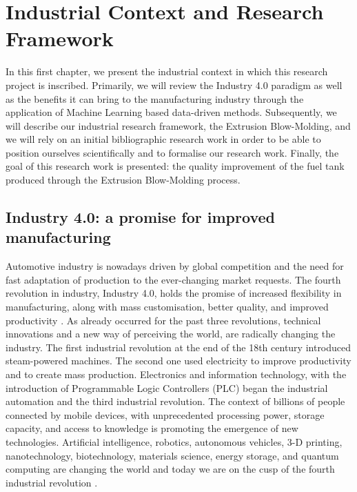 \chapter{Industrial Context and Research Framework}
\minitoc

In this first chapter, we present the industrial context in which this research project is inscribed. Primarily, we will review the Industry 4.0 paradigm as well as the benefits it can bring to the manufacturing industry through the application of Machine Learning based data-driven methods. Subsequently, we will describe our industrial research framework, the Extrusion Blow-Molding, and we will rely on an initial bibliographic research work in order to be able to position ourselves scientifically and to formalise our research work. Finally, the goal of this research work is presented: the quality improvement of the fuel tank produced through the Extrusion Blow-Molding process.  

\section{Industry 4.0: a promise for improved manufacturing}

Automotive industry is nowadays driven by global competition and the need for fast adaptation of production to the ever-changing market requests. The fourth revolution in industry, Industry 4.0, holds the promise of increased flexibility in manufacturing, along with mass customisation, better quality, and improved productivity \citep{zhong2017intelligent}. As already occurred for the past three revolutions, technical innovations and a new way of perceiving the world, are radically changing the industry. The first industrial revolution at the end of the 18th century introduced steam-powered machines. The second one used electricity to improve productivity and to create mass production. Electronics and information technology, with the introduction of Programmable Logic Controllers (PLC) began the industrial automation and the third industrial revolution. The context of billions of people connected by mobile devices, with unprecedented processing power, storage capacity, and access to knowledge is promoting the emergence of new technologies. Artificial intelligence, robotics, autonomous vehicles, 3-D printing, nanotechnology, biotechnology, materials science, energy storage, and quantum computing are changing the world and today we are on the cusp of the fourth industrial revolution \citep{schwab20164th}.  

